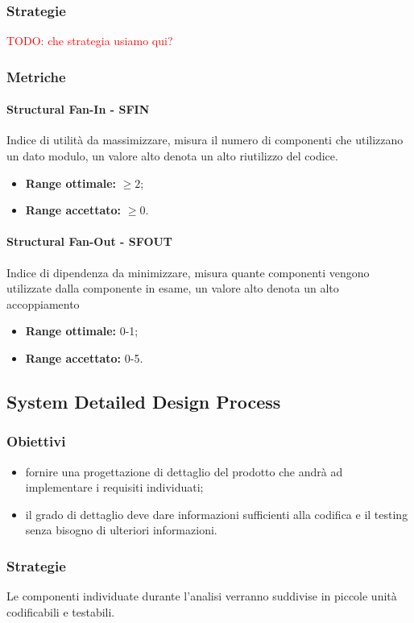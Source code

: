 		\subsubsection{Strategie}
		\textcolor{red} {TODO: che strategia usiamo qui?}
		\subsubsection{Metriche}
			\paragraph{Structural Fan-In - SFIN} 
			Indice di utilità da massimizzare, misura il numero di componenti che utilizzano un dato modulo, un valore alto denota un alto riutilizzo del codice.
			\begin{itemize}
				\item \textbf{Range ottimale:} $\geq 2$;
				\item \textbf{Range accettato:} $\geq 0$.
			\end{itemize}
			\paragraph{Structural Fan-Out - SFOUT}
			Indice di dipendenza da minimizzare, misura quante componenti vengono utilizzate dalla componente in esame, un valore alto denota un alto accoppiamento
			\begin{itemize}
				\item \textbf{Range ottimale:} 0-1;
				\item \textbf{Range accettato:} 0-5.
			\end{itemize}
            

	\subsection{System Detailed Design Process}
		\subsubsection{Obiettivi}
		\begin{itemize}
			\item fornire una progettazione di dettaglio del prodotto che andrà ad implementare i requisiti individuati;
			\item il grado di dettaglio deve dare informazioni sufficienti alla codifica e il testing senza bisogno di ulteriori informazioni.
		\end{itemize}
		\subsubsection{Strategie}
		Le componenti individuate durante l'analisi verranno suddivise in piccole unità codificabili e testabili.
